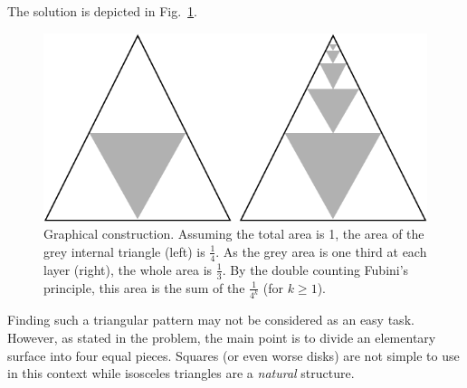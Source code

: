 \begin{itemize}
The solution is depicted in Fig.~\ref{Fig:Sumgeo1sur4}. 
\begin{figure}
\begin{center}
        \includegraphics[scale=0.3]{FiguresArithmetic/SumGeometric1sur4}
        \caption{Graphical construction. Assuming the total area is 1, the area of the grey internal triangle (left) is $\frac{1}{4}$.
        As the grey area is one third at each layer (right), the whole area is $\frac{1}{3}$.
        By the double counting Fubini's principle, this area is the sum of the $\frac{1}{4^k}$ (for $k \geq 1$).}
        \label{Fig:Sumgeo1sur4}
\end{center}
\end{figure}

Finding such a triangular pattern may not be considered as an easy task.
However, as stated in the problem, the main point is to divide an elementary surface
into four equal pieces. 
Squares (or even worse disks) are not simple to use in this context while isosceles triangles 
are a \textit{natural} structure. 

\end{itemize}

